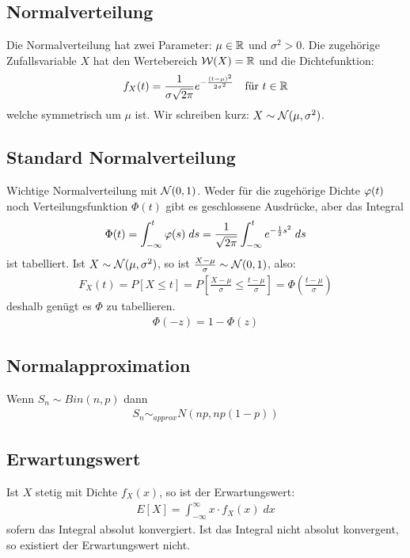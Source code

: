 \subsection*{Normalverteilung}
Die Normalverteilung hat zwei Parameter: $\mu \in \mathbb{R}$ und $\sigma^2 > 0$. Die
zugehörige Zufallsvariable $X$ hat den Wertebereich $\mathcal{W} (X) = \mathbb{R}$ und die
Dichtefunktion:
\begin{align*}
  f_X (t) = \frac{1}{\sigma \sqrt{2 \pi}} e^{- \frac{{(t - \mu)}^2}{2 \sigma^2}}
   &  & \text{für } t \in \mathbb{R}
\end{align*}
welche symmetrisch um $\mu$ ist. Wir schreiben kurz: $X \sim \mathcal{N} (\mu, \sigma^2)$.
\subsection*{Standard Normalverteilung}
Wichtige Normalverteilung mit $\mathcal{N} (0, 1)$. Weder für die
zugehörige Dichte $\varphi (t)$ noch Verteilungsfunktion $\Phi (t)$ gibt es
geschlossene Ausdrücke, aber das Integral
\begin{align*}
  \Phi (t) = \int_{-\infty}^t \varphi (s) \; ds =
  \frac{1}{\sqrt{2\pi}} \int_{-\infty}^t e^{-\frac{1}{2} s^2} \; ds
\end{align*}
ist tabelliert. Ist $X \sim \mathcal{N} (\mu, \sigma^2)$, so ist
$\frac{X - \mu}{\sigma} \sim \mathcal{N} (0, 1)$, also:
\begin{align*}
  F_X (t) = P[X \leq t] = P \left[ \frac{X-\mu}{\sigma} \leq \frac{t - \mu}{\sigma} \right] = \Phi \left  ( \frac{t - \mu}{\sigma} \right)
\end{align*}
deshalb genügt es $\Phi$ zu tabellieren.
\begin{align*}
  \Phi (-z) = 1 - \Phi (z)
\end{align*}
\subsection*{Normalapproximation}
Wenn $S_n \sim Bin (n, p)$ dann
\begin{align*}
  S_n \sim_{approx} N (np, np (1-p))
\end{align*}
\subsection*{Erwartungswert}
Ist $X$ stetig mit Dichte $f_X (x)$, so ist der Erwartungswert:
\begin{align*}
  E[X] = \int_{-\infty}^\infty x \cdot f_X (x) \; dx
\end{align*}
sofern das Integral absolut konvergiert. Ist das Integral nicht
absolut konvergent, so existiert der Erwartungswert nicht.
